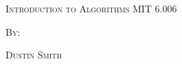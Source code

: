 \documentclass[dvipsnames,svgnames,x11names]{scrbook}%
\begin{document}
%
\pagecolor{gray!50}
\begin{center}
  \begin{center}
  \vspace*{\fill}
  \textsc{\LARGE Introduction to Algorithms MIT 6.006}
  \par\bigskip
  \textsc{By:}
  \par\bigskip
  \textsc{\LARGE Dustin Smith}
  \vspace*{\fill}
\end{center}
\end{center}

\newpage

\tableofcontents

\newpage








\end{document}
